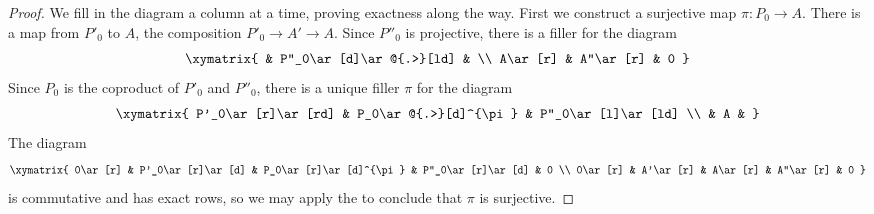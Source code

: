 \documentclass[12pt]{article}
\begin{document}
\begin{proof}
We fill in the diagram a column at a time, proving exactness along the way.
First we construct a surjective map $\pi\colon P_0\to A$.  There is a map
from $P'_0$ to $A$, the composition $P'_0\to A'\to A$.  Since $P''_0$ is projective, there is a filler for the diagram
\[\xymatrix{
        & P''_0\ar[d]\ar@{.>}[ld] & \\
A\ar[r] & A''\ar[r]               & 0
}\]
Since $P_0$ is the coproduct of $P'_0$ and $P''_0$, there is a
unique filler $\pi$ for the diagram
\[\xymatrix{
P'_0\ar[r]\ar[rd] & P_0\ar@{.>}[d]^{\pi} & P''_0\ar[l]\ar[ld] \\
                  & A                    &
}\]
The diagram
\[\xymatrix{
0\ar[r] &
P'_0\ar[r]\ar[d] &
P_0\ar[r]\ar[d]^{\pi} &
P''_0\ar[r]\ar[d] &
0 \\
0\ar[r] & A'\ar[r] & A\ar[r] & A''\ar[r] & 0
}\]
is commutative and has exact rows, so we may apply the 
to conclude that $\pi$ is surjective.


\end{proof}
\end{document}

